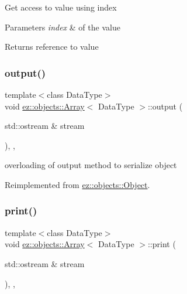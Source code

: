 Get access to value using index 
\begin{DoxyParams}{Parameters}
{\em index} & of the value \\
\hline
\end{DoxyParams}
\begin{DoxyReturn}{Returns}
reference to value 
\end{DoxyReturn}
\mbox{\label{classez_1_1objects_1_1Array_a7f8b26dd8b96708d0a300a1f406ce336}} 
\subsubsection{\texorpdfstring{output()}{output()}}
{\footnotesize\ttfamily template$<$class Data\+Type$>$ \\
void \hyperlink{classez_1_1objects_1_1Array}{ez\+::objects\+::\+Array}$<$ Data\+Type $>$\+::output (\begin{DoxyParamCaption}\item[{std\+::ostream \&}]{stream }\end{DoxyParamCaption})\hspace{0.3cm}{\ttfamily [inline]}, {\ttfamily [override]}, {\ttfamily [virtual]}}

overloading of output method to serialize object 

Reimplemented from \hyperlink{classez_1_1objects_1_1Object_a0fdfe18e6c35d6b0d7e7a01265aded15}{ez\+::objects\+::\+Object}.

\mbox{\label{classez_1_1objects_1_1Array_a7f0707629712319837dc0cda091456b7}} 
\subsubsection{\texorpdfstring{print()}{print()}}
{\footnotesize\ttfamily template$<$class Data\+Type$>$ \\
void \hyperlink{classez_1_1objects_1_1Array}{ez\+::objects\+::\+Array}$<$ Data\+Type $>$\+::print (\begin{DoxyParamCaption}\item[{std\+::ostream \&}]{stream }\end{DoxyParamCaption})\hspace{0.3cm}{\ttfamily [inline]}, {\ttfamily [override]}, {\ttfamily [virtual]}}

